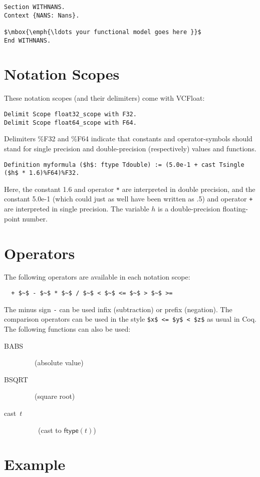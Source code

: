 \documentclass[article]{memoir}
\begin{document}
\begin{lstlisting}
Section WITHNANS.
Context {NANS: Nans}.

$\mbox{\emph{\ldots your functional model goes here }}$
End WITHNANS.
\end{lstlisting}

\chapter{Notation Scopes}
These notation scopes (and their delimiters) come with VCFloat:
\begin{lstlisting}
Delimit Scope float32_scope with F32.
Delimit Scope float64_scope with F64.
\end{lstlisting}

Delimiters \%F32 and \%F64 indicate that constants and operator-symbols should stand for single precision and double-precision (respectively) values and functions.
\begin{lstlisting}
Definition myformula ($h$: ftype Tdouble) := (5.0e-1 + cast Tsingle ($h$ * 1.6)%F64)%F32.
\end{lstlisting}
Here, the constant 1.6 and operator \lstinline{*} are
interpreted in double precision,
and the constant 5.0e-1 (which could just as well have been written
as .5) and operator \lstinline{+} are interpreted in single precision.
The variable $h$ is a double-precision floating-point number.

\chapter{Operators}
The following operators are available in each notation scope:
\begin{lstlisting}
  + $~$ - $~$ * $~$ / $~$ < $~$ <= $~$ > $~$ >= 
\end{lstlisting}
The minus sign \lstinline{-} can be used infix (subtraction) or prefix (negation).  The comparison operators can be used in the style
\lstinline{$x$ <= $y$ < $z$} as usual in Coq.
The following functions can also be used:
\begin{description}
\item[\textsf{BABS}]  ~~~(absolute value)
\item[\textsf{BSQRT}]  ~~~(square root)
\item[\textsf{cast~$t$}]  ~~~~(cast to $\mathsf{ftype}(t)$)
\end{description}

\chapter{Example}
\end{document}
